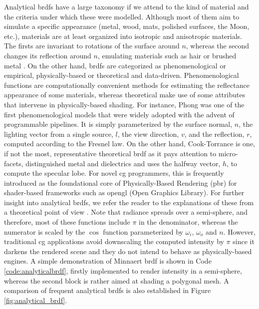 Analytical \acrshort{brdf}s have a large taxonomy if we attend to the kind of material and the criteria under which these were modelled. Although most of them aim to simulate a specific appearance (metal, wood, mats, polished surfaces, the Moon, etc.), materials are at least organized into isotropic and anisotropic materials. The firsts are invariant to rotations of the surface around $n$, whereas the second changes its reflection around $n$, emulating materials such as hair or brushed metal \cite{guarnera_brdf_2016}. On the other hand, \acrshort{brdf}s are categorized as phenomenological or empirical, physically-based or theoretical and data-driven. Phenomenological functions are computationally convenient methods for estimating the reflectance appearance of some materials, whereas theoretical make use of some attributes that intervene in physically-based shading. For instance, Phong was one of the first phenomenological models that were widely adopted with the advent of programmable pipelines. It is simply parameterized by the surface normal, $n$, the lighting vector from a single source, $l$, the view direction, $v$, and the reflection, $r$, computed according to the Fresnel law. On the other hand, Cook-Torrance is one, if not the most, representative theoretical \acrshort{brdf} as it pays attention to micro-facets, distinguished metal and dielectrics and uses the halfway vector, $h$, to compute the specular lobe. For novel \acrshort{cg} programmers, this is frequently introduced as the foundational core of Physically-Based Rendering (\acrshort{pbr}) for shader-based frameworks such as \acrshort{opengl} (Open Graphics Library). For further insight into analytical \acrshort{brdf}s, we refer the reader to the explanations of these from a theoretical point of view \cite{guarnera_brdf_2016, soldado_overview_2012}. Note that radiance spreads over a semi-sphere, and therefore, most of these functions include $\pi$ in the denominator, whereas the numerator is scaled by the $\cos$ function parameterized by $\omega_i$, $\omega_o$ and $n$. However, traditional \acrshort{cg} applications avoid downscaling the computed intensity by $\pi$ since it darkens the rendered scene and they do not intend to behave as physically-based engines. A simple demonstration of Minnaert \acrshort{brdf} is shown in Code \ref{code:analyticalbrdf}, firstly implemented to render intensity in a semi-sphere, whereas the second block is rather aimed at shading a polygonal mesh. A comparison of frequent analytical \acrshort{brdf}s is also established in Figure \ref{fig:analytical_brdf}.


